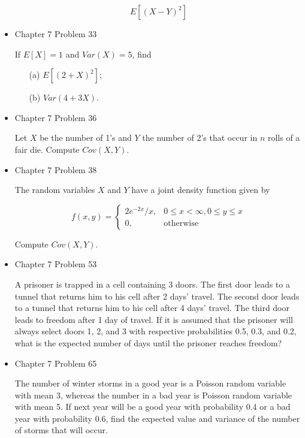 \documentclass[11pt]{article}
\begin{document}
\begin{itemize}
    $$
    E[(X - Y)^2]
    $$

    \item
    Chapter 7 Problem 33
    
    If $E[X] = 1$ and $Var(X) = 5$, find
    
    \begin{itemize}
    \item[(a)] $E[(2 + X)^2]$;
    \item[(b)] $Var(4 + 3X)$.
    \end{itemize}

    \item
    Chapter 7 Problem 36
    
    Let $X$ be the number of 1's and $Y$ the number of 2's that occur in $n$ rolls of a fair die. Compute $Cov(X, Y)$.

    \item
    Chapter 7 Problem 38
    
    The random variables $X$ and $Y$ have a joint density function given by
    
     \begin{equation*}
    f(x, y) =
    \begin{cases}
      2 e^{-2x}/x, & 0 \leq x < \infty, 0 \leq y \leq x \\
      0, & \text{otherwise}
    \end{cases}
  \end{equation*}
  
  Compute $Cov(X, Y)$.

    \item
    Chapter 7 Problem 53
    
    A prisoner is trapped in a cell containing 3 doors. The first door leads to a tunnel that returns him to his cell after 2 days' travel. The second door leads to a tunnel that returns him to his cell after 4 days' travel. The third door leads to freedom after 1 day of travel. If it is assumed that the prisoner will always select doors 1, 2, and 3 with respective probabilities 0.5, 0.3, and 0.2, what is the expected number of days until the prisoner reaches freedom?

    \item
    Chapter 7 Problem 65
    
    The number of winter storms in a good year is a Poisson random variable with mean 3, whereas the number in a bad year is Poisson random variable with mean 5. If next year will be a good year with probability 0.4 or a bad year with probability 0.6, find the expected value and variance of the number of storms that will occur. 



%
%


\end{itemize}
\end{document}
